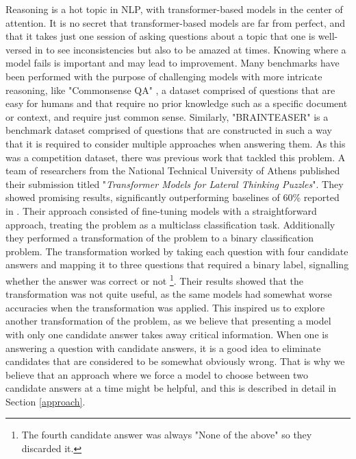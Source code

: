 Reasoning is a hot topic in NLP, with transformer-based models in the center of attention.
It is no secret that transformer-based models are far from perfect, and that it takes just one session of asking questions about a topic that one is well-versed in to see inconsistencies but also to be amazed at times.
Knowing where a model fails is important and may lead to improvement.  Many benchmarks have been performed with the purpose of challenging models with more intricate reasoning, like "Commonsense QA" \citep{commonsenseQA}, a dataset comprised of questions that are easy for humans and that require no prior knowledge such as a specific document or context, and require just common sense.
Similarly, "BRAINTEASER" \citep{semeval} is a benchmark dataset comprised of questions that are constructed in such a way that it is required to consider multiple approaches when answering them.
As this was a competition dataset, there was previous work that tackled this problem.
A team of researchers from the National Technical University of Athens published their submission \citep{ails-lab} titled "\textit{Transformer Models for Lateral Thinking Puzzles}".
They showed promising results, significantly outperforming baselines of 60\% reported in \citep{semeval}.
Their approach consisted of fine-tuning models with a straightforward approach, treating the problem as a multiclass classification task. Additionally they performed a transformation of the problem to a binary classification problem. 
The transformation worked by taking each question with four candidate answers and mapping it to three questions that required a binary label, signalling whether the answer was correct or not \footnote[1]{The fourth candidate answer was always "None of the above" so they discarded it.}.
Their results showed that the transformation was not quite useful, as the same models had somewhat worse accuracies when the transformation was applied.  
This inspired us to explore another transformation of the problem, as we believe that presenting a model with only one candidate answer takes away critical information.
When one is answering a question with candidate answers, it is a good idea to eliminate candidates that are considered to be somewhat obviously wrong.
That is why we believe that an approach where we force a model to choose between two candidate answers at a time might be helpful, and this is described in detail in Section \ref{approach}.